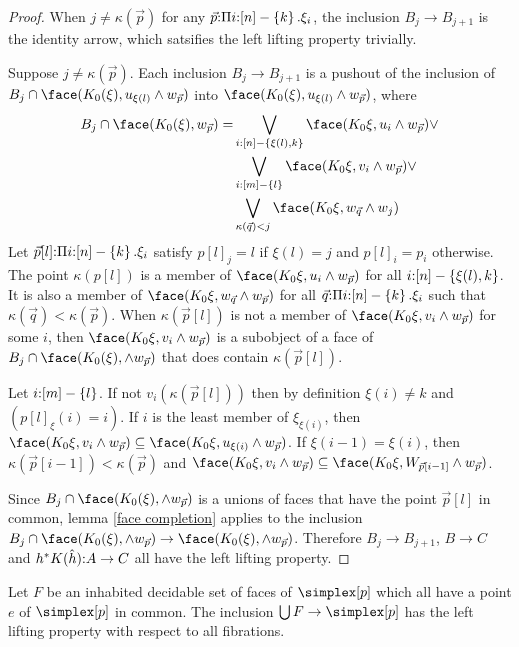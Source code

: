 \documentclass[csh.tex]{subfiles}
\begin{document}
\begin{proof}
When $j\neq\kappa(\vec p)$ for any $\vec p \mathord : \Pi i\mathord : [n]-\left\{k\right\} .{\xi_i}$, the inclusion $B_j\to B_{j+1}$ is the identity arrow, which satsifies the left lifting property trivially. 

Suppose $j\neq\kappa(\vec p)$. Each inclusion $B_j\to B_{j+1}$ is a pushout of the inclusion of $B_j\cap \face(K_0(\xi),u_{\xi(l)}\land w_{\vec p})$ into $\face(K_0(\xi),u_{\xi(l)}\land w_{\vec p})$, where
\begin{align*} B_j\cap \face(K_0(\xi),w_{\vec p}) = 
&\bigvee_{i\of [n]-\set{\xi(l),k}}\face(K_0\xi,u_i\land w_{\vec p})\vee\\
&\bigvee_{i\of [m]-\set l} \face(K_0\xi,v_i\land w_{\vec p})\vee\\
&\bigvee_{\kappa(\vec q)<j} \face(K_0\xi,w_{\vec q}\land w_j)
\end{align*}
Let $\vec p[l]\mathord : \Pi i\mathord : [n]-\left\{k\right\} .{\xi_i}$ satisfy $p[l]_j = l$ if $\xi(l)=j$ and $p[l]_i=p_i$ otherwise. The point $\kappa(p[l])$ is a member of $\face(K_0\xi,u_i\land w_{\vec p})$ for all $i\mathord : [n]-\left\{\xi(l),k\right\}$. It is also a member of $\face(K_0\xi,w_{\vec q}\land w_{\vec p})$ for all $\vec q\mathord : \Pi i\mathord : [n]-\left\{k\right\} .{\xi_i}$ such that $\kappa(\vec q)<\kappa(\vec p)$. When $\kappa(\vec p[l])$ is not a member of $\face(K_0\xi,v_i\land w_{\vec p})$ for some $i$, then $\face(K_0\xi,v_i\land w_{\vec p})$ is a subobject of a face of $B_j\cap \face(K_0(\xi),\land w_{\vec p})$ that does contain $\kappa(\vec p[l])$.

Let $i\mathord :[m]-\left\{l\right\}$. If not $v_i(\kappa(\vec p[l]))$ then by definition $\xi(i)\neq k$ and $(p[l]_\xi(i) = i)$. If $i$ is the least member of $\xi_{\xi(i)}$, then $\face(K_0\xi,v_i\land w_{\vec p})\subseteq \face(K_0\xi,u_{\xi(i)}\land w_{\vec p})$. If $\xi(i-1)=\xi(i)$, then $\kappa(\vec p[i-1])<\kappa(\vec p)$ and $\face(K_0\xi,v_i\land w_{\vec p})\subseteq \face(K_0\xi,W_{\vec p[i-1]}\land w_{\vec p})$.

Since $B_j\cap \face(K_0(\xi),\land w_{\vec p})$ is a unions of faces that have the point $\vec p[l]$ in common, lemma \ref{face completion} applies to the inclusion $B_j\cap \face(K_0(\xi),\land w_{\vec p})\to \face(K_0(\xi),\land w_{\vec p})$. Therefore $B_j\to B_{j+1}$, $B\to C$ and $h^* K(\hat h)\mathord : A\to C$ all have the left lifting property.
\end{proof}

\begin{lemma} Let $F$ be an inhabited decidable set of faces of $\simplex[p]$ which all have a point $e$ of $\simplex[p]$ in common. The inclusion $\bigcup F\to \simplex[p]$ has the left lifting property with respect to all fibrations. \label{face completion} \end{lemma}
\end{document}
